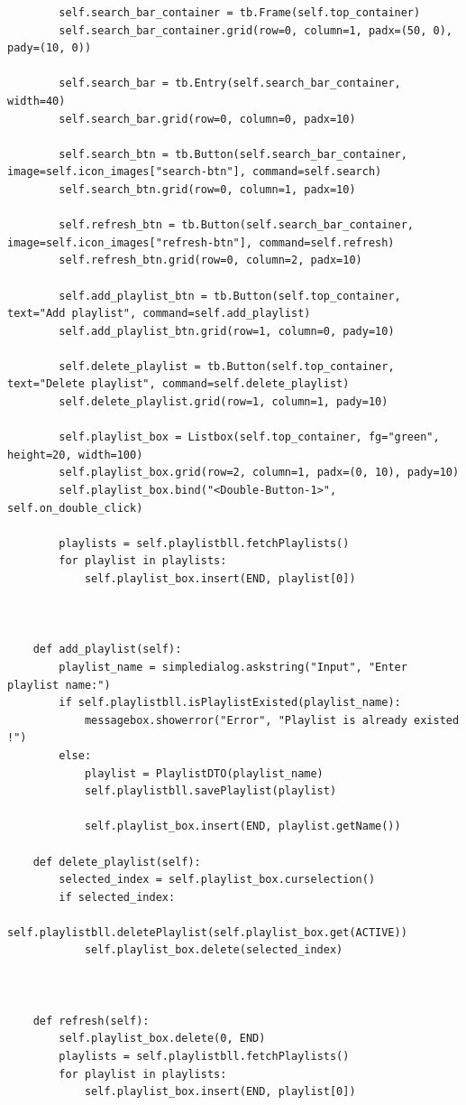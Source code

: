 \documentclass[a4paper]{article}
\begin{document}
\begin{mdframed}[hidealllines=true,backgroundcolor=magenta!10]
\begin{lstlisting}
        self.search_bar_container = tb.Frame(self.top_container)
        self.search_bar_container.grid(row=0, column=1, padx=(50, 0), pady=(10, 0))

        self.search_bar = tb.Entry(self.search_bar_container, width=40)
        self.search_bar.grid(row=0, column=0, padx=10)

        self.search_btn = tb.Button(self.search_bar_container, image=self.icon_images["search-btn"], command=self.search)
        self.search_btn.grid(row=0, column=1, padx=10)

        self.refresh_btn = tb.Button(self.search_bar_container, image=self.icon_images["refresh-btn"], command=self.refresh)
        self.refresh_btn.grid(row=0, column=2, padx=10)

        self.add_playlist_btn = tb.Button(self.top_container, text="Add playlist", command=self.add_playlist)
        self.add_playlist_btn.grid(row=1, column=0, pady=10)

        self.delete_playlist = tb.Button(self.top_container, text="Delete playlist", command=self.delete_playlist)
        self.delete_playlist.grid(row=1, column=1, pady=10)

        self.playlist_box = Listbox(self.top_container, fg="green", height=20, width=100)
        self.playlist_box.grid(row=2, column=1, padx=(0, 10), pady=10)
        self.playlist_box.bind("<Double-Button-1>", self.on_double_click)

        playlists = self.playlistbll.fetchPlaylists()
        for playlist in playlists:
            self.playlist_box.insert(END, playlist[0])



    def add_playlist(self):
        playlist_name = simpledialog.askstring("Input", "Enter playlist name:")
        if self.playlistbll.isPlaylistExisted(playlist_name):
            messagebox.showerror("Error", "Playlist is already existed !")
        else:
            playlist = PlaylistDTO(playlist_name)
            self.playlistbll.savePlaylist(playlist)

            self.playlist_box.insert(END, playlist.getName())

    def delete_playlist(self):
        selected_index = self.playlist_box.curselection()
        if selected_index:
            self.playlistbll.deletePlaylist(self.playlist_box.get(ACTIVE))
            self.playlist_box.delete(selected_index)



    def refresh(self):
        self.playlist_box.delete(0, END)
        playlists = self.playlistbll.fetchPlaylists()
        for playlist in playlists:
            self.playlist_box.insert(END, playlist[0])


\end{lstlisting}
\end{mdframed}
\end{document}
